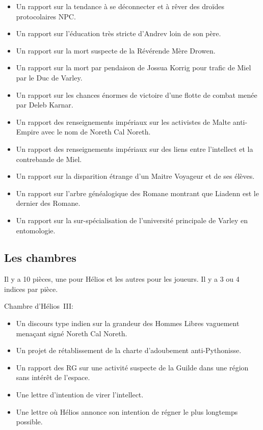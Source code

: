 \documentclass{article}
\begin{document}
\begin{itemize}
    \item Un rapport sur la tendance à se déconnecter et à \og rêver \fg{} des
        droïdes protocolaires NPC.
    \item Un rapport sur l'éducation très stricte d'Andrev loin de son père.
    \item Un rapport sur la mort suspecte de la Révérende Mère Drowen.
    \item Un rapport sur la mort par pendaison de Jossua Korrig pour trafic de
        Miel par le Duc de Varley.
    \item Un rapport sur les chances énormes de victoire d'une flotte de combat
        menée par Deleb Karnar.
    \item Un rapport des renseignements impériaux sur les activistes de Malte
        anti-Empire avec le nom de Noreth Cal Noreth.
    \item Un rapport des renseignements impériaux sur des liens entre
        l'intellect et la contrebande de Miel.
    \item Un rapport sur la disparition étrange d'un Maitre Voyageur et de ses
        élèves.
    \item Un rapport sur l'arbre généalogique des Romane montrant que Liadenn
        est le dernier des Romane.
    \item Un rapport sur la sur-spécialisation de l'université principale de
        Varley en entomologie.
\end{itemize}

\subsection*{Les chambres}

Il y a 10 pièces, une pour Hélios et les autres pour les joueurs. Il y a 3 ou 4
indices par pièce.

Chambre d'Hélios~III:
\begin{itemize}
    \item Un discours type \og indien\fg{} sur la grandeur des Hommes Libres
        vaguement menaçant signé Noreth Cal Noreth.
    \item Un projet de rétablissement de la charte d'adoubement
        anti-Pythonisse.
    \item Un rapport des RG sur une activité suspecte de la Guilde dans une
        région sans intérêt de l'espace.
    \item Une lettre d'intention de virer l'intellect.
    \item Une lettre où Hélios annonce son intention de régner le plus
        longtemps possible.
\end{itemize}
\end{document}
